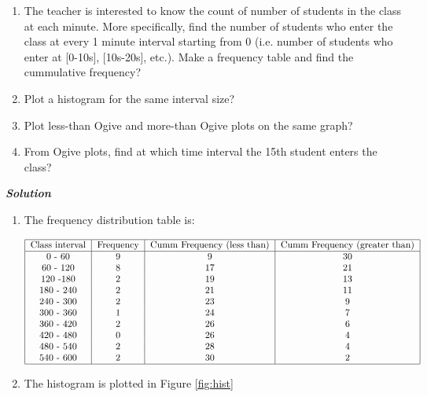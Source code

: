\documentclass[12pt, oneside]{article}
\begin{document}
\begin{enumerate}
\begin{enumerate}
\item The teacher is interested to know the count of number of students in the class at each minute. More specifically, find the number of students who enter the class at every 1 minute interval starting from 0 (i.e. number of students who enter at [0-10s], [10s-20s], etc.). Make a frequency table and find the cummulative frequency?

\item Plot a histogram for the same interval size?
\item Plot less-than Ogive and more-than Ogive plots on the same graph?
\item From Ogive plots, find at which time interval the 15th student enters the class?
\end{enumerate}

\textit{\textbf{Solution}}

\begin{enumerate}
    \item The frequency distribution table is:

\begin{align}
\centering
    \begin{tabular}{|c|c|c|c|}
    \hline
    Class interval & Frequency & Cumm Frequency (less than) & Cumm Frequency (greater than) \\
    \hline
    0 - 60  &    9  & 9   & 30 \\
    60 - 120 &   8  & 17  & 21 \\
    120 -180 &   2  & 19  & 13 \\
    180 - 240 &  2  & 21  & 11 \\
    240 - 300 &  2  & 23  & 9 \\
    300 - 360 &  1  & 24  & 7 \\
    360 - 420 &  2  & 26  & 6 \\
    420 - 480 &  0  & 26  & 4 \\
    480 - 540 &  2  & 28  & 4 \\
    540 - 600 &  2  & 30  & 2 \\
        \hline
    \end{tabular}
\end{align}

\item The histogram is plotted in Figure \ref{fig:hist}


\end{enumerate}
\end{enumerate}
\end{document}
